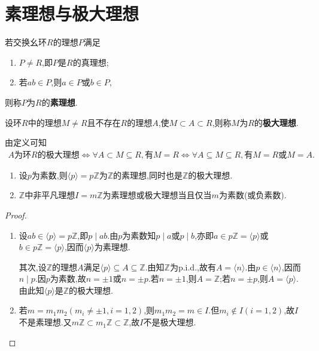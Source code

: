 \documentclass[../../main.tex]{subfiles}%
\begin{document}
\section{素理想与极大理想}

\begin{definition}[素理想]
若交换幺环$R$的理想$P$满足
\begin{enumerate}[(1)]
\item $P \neq R$,即$P$是$R$的真理想;
\item 若$ab \in P$,则$a \in P$或$b \in P$,
\end{enumerate}
则称$P$为$R$的\textbf{素理想}.
\end{definition}

\begin{definition}[极大理想]
设环$R$中的理想$M \neq R$且不存在$R$的理想$A$,使$M \subset A \subset R$,则称$M$为$R$的\textbf{极大理想}.
\end{definition}
\begin{remark}
由定义可知
\begin{align*}
A\text{为环}R\text{的极大理想}\Longleftrightarrow \forall A\subset M\subseteq R,\text{有}M=R\Longleftrightarrow \forall A\subseteq M\subseteq R,\text{有}M=R\text{或}M=A.
\end{align*}
\end{remark}

\begin{proposition}
\begin{enumerate}[(1)]
\item 设$p$为素数,则$\langle p \rangle=p\mathbb{Z}$为$\mathbb{Z}$的素理想,同时也是$\mathbb{Z}$的极大理想.

\item $\mathbb{Z}$中非平凡理想$I = m\mathbb{Z}$为素理想或极大理想当且仅当$m$为素数(或负素数).
\end{enumerate}
\end{proposition}
\begin{proof}
\begin{enumerate}[(1)]
\item 设$ab \in \langle p \rangle=p\mathbb{Z}$,即$p \mid ab$.由$p$为素数知$p \mid a$或$p \mid b$,亦即$a \in p\mathbb{Z}=\langle p \rangle$或$b \in p\mathbb{Z}= \langle p \rangle$,因而$\langle p \rangle$为素理想.

其次,设$\mathbb{Z}$的理想$A$满足$\langle p \rangle \subseteq A \subseteq \mathbb{Z}$.由知$\mathbb{Z}$为p.i.d.,故有$A = \langle n \rangle$.由$p \in \langle n \rangle$,因而$n \mid p$.因$p$为素数,故$n = \pm 1$或$n = \pm p$.若$n = \pm 1$,则$A = \mathbb{Z}$;若$n = \pm p$,则$A = \langle p \rangle$.由此知$\langle p \rangle$是$\mathbb{Z}$的极大理想.

\item 若$m = m_1m_2(m_i \neq \pm 1,i = 1,2)$,则$m_1m_2 = m \in I$.但$m_i \notin I(i = 1,2)$,故$I$不是素理想.又$m\mathbb{Z} \subset m_1\mathbb{Z} \subset \mathbb{Z}$,故$I$不是极大理想.\
\end{enumerate}
\end{proof}
\end{document}

